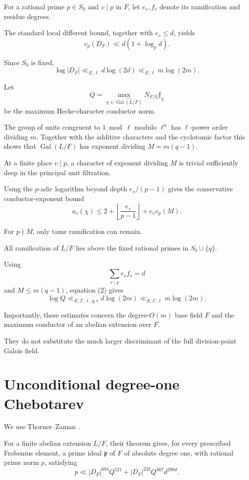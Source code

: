 \documentclass[11pt]{article}
\begin{document}
For a rational prime $p\in S_0$ and
$v\mid p$ in $F$, let $e_v,f_v$
denote its ramification and residue
degrees.

The standard local different bound,
together with $e_v\le d$, yields
\[
v_p(D_F)\ll d(1+\log_p d).
\]

Since $S_0$ is fixed,
\[
\boxed{
\log|D_F|\ll_{E,\ell}d\log(2d)
\ll_{E,\ell}m\log(2m).
}
\tag{1}
\]

Let
\[
Q=\max_{\chi\in
\widehat{\operatorname{Gal}(L/F)}}
N_{F/\mathbb Q}\mathfrak f_\chi
\]
be the maximum Hecke-character
conductor norm.

The group of units congruent to $1\bmod\ell$ modulo $\ell^n$ has $\ell$-power order dividing $m$. Together with the additive characters and the cyclotomic factor this shows that $\operatorname{Gal}(L/F)$ has exponent dividing $M=m(q-1)$.

At a finite place $v\mid p$, a character
of exponent dividing $M$ is trivial
sufficiently deep in the principal
unit filtration.

Using the $p$-adic logarithm beyond
depth $e_v/(p-1)$ gives the conservative
conductor-exponent bound
\[
\boxed{
a_v(\chi)\le
2+\left\lfloor\frac{e_v}{p-1}\right\rfloor
+e_vv_p(M).
}
\tag{2}
\]

For $p\nmid M$, only tame ramification
can remain.

All ramification of $L/F$ lies above
the fixed rational primes in
$S_0\cup\{q\}$.

Using
\[
\sum_{v\mid p}e_vf_v=d
\]
and $M\le m(q-1)$, equation (2) gives
\[
\boxed{
\log Q\ll_{E,\Gamma,\ell,q,r}
d\log(2m)
\ll_{E,\Gamma,\ell}
m\log(2m).
}
\tag{3}
\]

Importantly, these estimates concern
the degree-$O(m)$ base field $F$ and
the maximum conductor of an abelian
extension over $F$.

They do not substitute the much larger
discriminant of the full division-point
Galois field.

\section{Unconditional degree-one Chebotarev}

We use Thorner--Zaman
\cite[Theorem 1.1]{TZ}.

For a finite abelian extension $L/F$,
their theorem gives, for every prescribed
Frobenius element, a prime ideal
$\mathfrak p$ of $F$ of absolute degree
one, with rational prime norm $p$,
satisfying
\[
\boxed{
p\ll
|D_F|^{694}Q^{521}
+
|D_F|^{232}Q^{367}d^{290d}.
}
\tag{4}
\]
\end{document}
